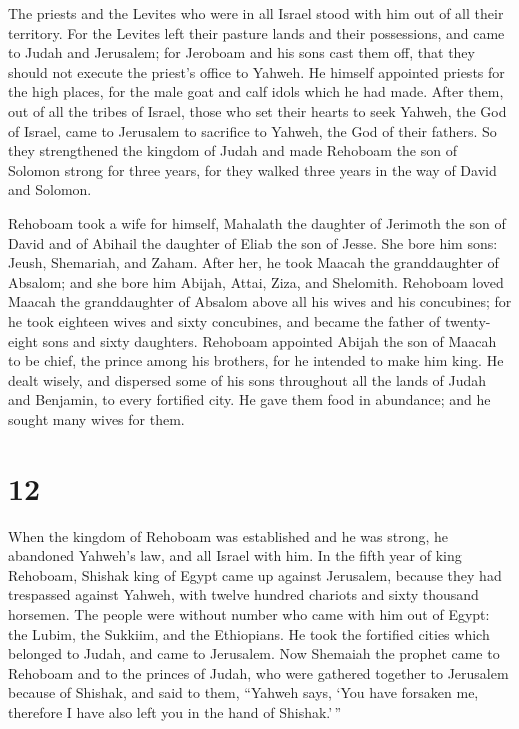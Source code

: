  The priests and the Levites who were in all Israel stood
with him out of all their territory.  For the Levites left
their pasture lands and their possessions, and came to Judah and
Jerusalem; for Jeroboam and his sons cast them off, that they should not
execute the priest's office to Yahweh.  He himself
appointed priests for the high places, for the male goat and calf idols
which he had made.  After them, out of all the tribes of
Israel, those who set their hearts to seek Yahweh, the God of Israel,
came to Jerusalem to sacrifice to Yahweh, the God of their fathers.
 So they strengthened the kingdom of Judah and made
Rehoboam the son of Solomon strong for three years, for they walked
three years in the way of David and Solomon.

 Rehoboam took a wife for himself, Mahalath the daughter of
Jerimoth the son of David and of Abihail the daughter of Eliab the son
of Jesse.  She bore him sons: Jeush, Shemariah, and Zaham.
 After her, he took Maacah the granddaughter of Absalom;
and she bore him Abijah, Attai, Ziza, and Shelomith. 
Rehoboam loved Maacah the granddaughter of Absalom above all his wives
and his concubines; for he took eighteen wives and sixty concubines, and
became the father of twenty-eight sons and sixty daughters.
 Rehoboam appointed Abijah the son of Maacah to be chief,
the prince among his brothers, for he intended to make him king.
 He dealt wisely, and dispersed some of his sons throughout
all the lands of Judah and Benjamin, to every fortified city. He gave
them food in abundance; and he sought many wives for them.

\hypertarget{section-11}{%
\section{12}\label{section-11}}

 When the kingdom of Rehoboam was established and he was
strong, he abandoned Yahweh's law, and all Israel with him. 
In the fifth year of king Rehoboam, Shishak king of Egypt came up
against Jerusalem, because they had trespassed against Yahweh,
 with twelve hundred chariots and sixty thousand horsemen.
The people were without number who came with him out of Egypt: the
Lubim, the Sukkiim, and the Ethiopians.  He took the
fortified cities which belonged to Judah, and came to Jerusalem.
 Now Shemaiah the prophet came to Rehoboam and to the
princes of Judah, who were gathered together to Jerusalem because of
Shishak, and said to them, ``Yahweh says, `You have forsaken me,
therefore I have also left you in the hand of Shishak.'\,''


